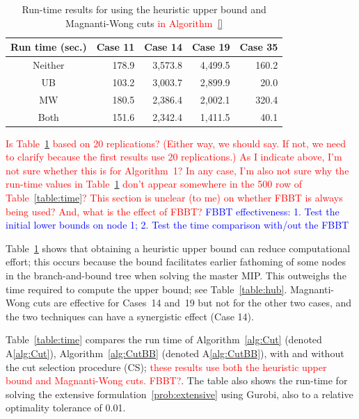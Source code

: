 \documentclass[11pt]{article}
\newcommand{\tcr}{\textcolor{red}}
\newcommand{\tcb}{\textcolor{blue}}
\begin{document}
	\begin{table}[H]
		\centering		
		\begin{tabular}{ c | r r r r }
			\hline
			Run time (sec.) & Case 11 & Case 14 & Case 19 & Case 35 \\ \hline
			Neither & 178.9 & 3,573.8 & 4,499.5 & 160.2 \\
			UB & 103.2 & 3,003.7 & 2,899.9 & 20.0\\
			MW & 180.5 & 2,386.4 & 2,002.1 & 320.4\\
			Both & 151.6 & 2,342.4 & 1,411.5 & 40.1\\
			\hline
		\end{tabular}
		\caption{Run-time results for using the heuristic upper bound and Magnanti-Wong cuts \tcr{in Algorithm~\ref{}}}
		\label{table:heuristics}
	\end{table}
	
	\tcr{Is Table~\ref{table:heuristics} based on 20 replications? (Either way, we should say. If not, we need to clarify because the first results use 20 replications.) As I indicate above, I'm not sure whether this is for Algorithm~1? In any case, I'm also not sure why the run-time values in Table~\ref{table:heuristics} don't appear somewhere in the 500 row of Table~\ref{table:time}? This section is unclear (to me) on whether FBBT is always being used? And, what is the effect of FBBT?}
	\tcb{FBBT effectiveness: 1. Test the initial lower bounds on node 1; 2. Test the time comparison with/out the FBBT}
	
	Table~\ref{table:heuristics} shows that obtaining a heuristic upper bound can reduce computational effort; this occurs because the bound facilitates earlier fathoming of some nodes in the branch-and-bound tree when solving the master MIP. This outweighs the time required to compute the upper bound; see Table~\ref{table:hub}. Magnanti-Wong cuts are effective for Cases~14 and~19 but not for the other two cases, and the two techniques can have a synergistic effect (Case 14). 
	
	Table~\ref{table:time} compares the run time of Algorithm~\ref{alg:Cut} (denoted A\ref{alg:Cut}), Algorithm~\ref{alg:CutBB} (denoted A\ref{alg:CutBB}), with and without the cut selection procedure (CS); \tcr{these results use both the heuristic upper bound and Magnanti-Wong cuts. FBBT?}. The table also shows the run-time for solving the extensive formulation~\eqref{prob:extensive} using Gurobi, also to a relative optimality tolerance of 0.01. 
	
\end{document}
